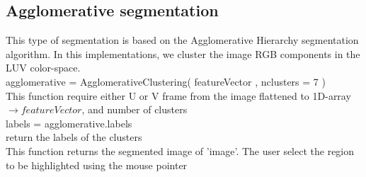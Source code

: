 \documentclass[letterpaper, 12 pt, conference ,onecolumn]{ieeeconf}  %
\begin{document}
\subsection*{Agglomerative segmentation}
This type of segmentation is based on the Agglomerative Hierarchy segmentation algorithm. In this  implementations, we cluster the image RGB components in the LUV color-space.
\\
agglomerative = AgglomerativeClustering( featureVector , nclusters = 7 )
\\
This function require either U or V frame from the image flattened to 1D-array $\rightarrow featureVector$, and number of clusters
\\
labels = agglomerative.labels
\\
return the labels of the clusters
\\
This function returns the segmented image of 'image'. The user select the region to be highlighted using the mouse pointer
\end{document}
